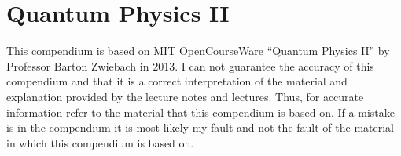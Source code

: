 \chapter{Quantum Physics II}
This compendium is based on MIT OpenCourseWare ``Quantum Physics II'' by Professor Barton Zwiebach in 2013.
I can not guarantee the accuracy of this compendium and that it is a correct interpretation of the material and explanation provided by the lecture notes and lectures. Thus, for accurate information refer to the material that this compendium is based on. If a mistake is in the compendium it is most likely my fault and not the fault of the material in which this compendium is based on.


